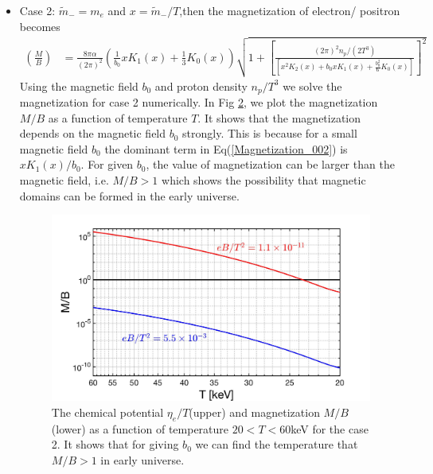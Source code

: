\documentclass[Universe,article,submit,moreauthors,pdftex]{Definitions/mdpi}
\begin{document}
\begin{itemize}
\begin{figure}[t]
\label{Case1_fig} 
\end{figure}
\\
  \item Case 2: $\tilde m_-=m_e$ and $x=\tilde m_-/T$,then the magnetization of electron/ positron becomes
\begin{align}\label{Magnetization_002}
\left(\frac{M}{B}\right)&=\frac{8\pi\alpha}{(2\pi)^2}\left(\frac{1}{b_0}xK_1(x)+\frac{1}{3}K_0(x)\right)\sqrt{1+\left[\frac{{(2\pi)^2n_p}/{(2T^3)}}{\left[x^2K_2(x)+b_0x K_1(x)+\frac{b^2_0}{6}K_0(x)\right]}\right]^2}
\end{align}
Using the magnetic field $b_0$ and proton density $n_p/T^3$ we solve the magnetization  for case 2 numerically. In Fig {\ref{Case2_fig}}, we plot the  magnetization $M/B$ as a function of temperature $T$. It shows that the magnetization depends on the magnetic field $b_0$ strongly. This is because for a small magnetic field $b_0$ the dominant term in Eq(\ref{Magnetization_002}) is $xK_1(x)/b_0$. For given $b_0$, the value of magnetization can be larger than the magnetic field, i.e. $M/B>1$  which shows the possibility that magnetic domains can be formed in the early universe.

\begin{figure}[h]
\centering
\includegraphics[width=0.75\linewidth]{./plots/Magnetization_case2.jpg}
\caption{The chemical potential $\eta_{e}/T$(upper) and magnetization $M/B$(lower) as a function of temperature $20<T<60$keV  for the case 2.  It shows that for giving $b_0$ we can find the temperature that $M/B>1$ in early universe.}
\label{Case2_fig} 
\end{figure}

\end{itemize}
\end{document}
